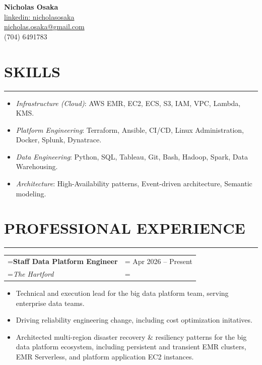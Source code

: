 \documentclass{article}
\def\name{Nicholas Osaka}
\def\lastname{Osaka}
\begin{document}
\pagestyle{fancy}
\fancyhead{}
\fancyfoot{}
\fancyfoot[C]{\lastname}
\vspace*{-.75cm}
\Large{\textbf{\name}}\\
\normalsize
\href{https://linkedin.com/in/nicholasosaka}{linkedin: nicholasosaka}\\
\href{mailto:nicholas.osaka@gmail.com}{nicholas.osaka@gmail.com}\\
(704) 649\textendash{}1783


\section*{\normalsize{SKILLS}}
\vspace{-1.8em}
\noindent\rule{\textwidth}{.5pt}
\begin{itemize}[label={}, leftmargin=1em]
    \setlength\itemsep{0em}
    \item \textit{Infrastructure (Cloud)}: AWS EMR, EC2, ECS, S3, IAM, VPC, Lambda, KMS.
    \item \textit{Platform Engineering}: Terraform, Ansible, CI/CD, Linux Administration, Docker, Splunk, Dynatrace.
    \item \textit{Data Engineering}: Python, SQL, Tableau, Git, Bash, Hadoop, Spark, Data Warehousing.
    \item \textit{Architecture}: High-Availability patterns, Event-driven architecture, Semantic modeling.
\end{itemize}

\section*{\normalsize{PROFESSIONAL EXPERIENCE}}
\vspace{-1.8em}
\noindent\rule{\textwidth}{.5pt}

\vspace{.5em}

\begin{tabularx}{\textwidth}{
    >{\raggedright\arraybackslash\hsize=1\hsize\linewidth=\hsize}X
    >{\raggedleft\arraybackslash\hsize=1\hsize\linewidth=\hsize}X }
    \textbf{Staff Data Platform Engineer} & Apr 2026 -- Present\\
    \textit{The Hartford} & \\
\end{tabularx}
\vspace{-.5em}
\begin{itemize}[label={•}, leftmargin=1em]
    \setlength\itemsep{0em}
    \item Technical and execution lead for the big data platform team, serving enterprise data teams.
    \item Driving reliability engineering change, including cost optimization initatives.
    \item Architected multi-region disaster recovery \& resiliency patterns for the big data platform ecosystem, including persistent and transient EMR clusters, EMR Serverless, and platform application EC2 instances.
\end{itemize}
\end{document}
